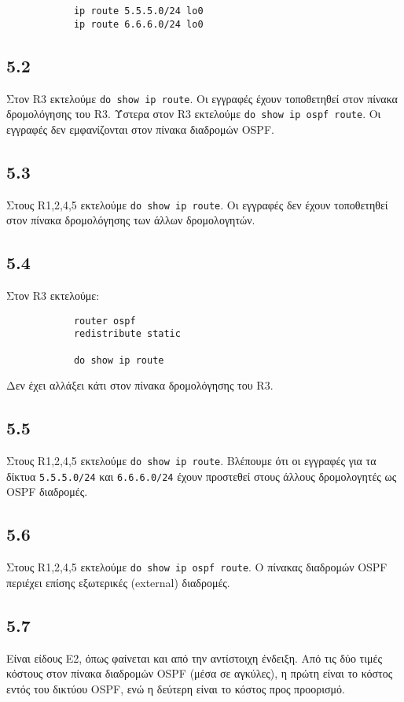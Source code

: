 \documentclass[a4paper, 12pt]{article}
\begin{document}
		\begin{verbatim}
			ip route 5.5.5.0/24 lo0
			ip route 6.6.6.0/24 lo0
		\end{verbatim}

	\subsection*{5.2}
		Στον R3 εκτελούμε \verb|do show ip route|. Οι εγγραφές έχουν τοποθετηθεί στον πίνακα δρομολόγησης του R3. Ύστερα στον R3 εκτελούμε \verb|do show ip ospf route|. Οι εγγραφές δεν εμφανίζονται στον πίνακα διαδρομών OSPF.

	\subsection*{5.3}
		Στους R1,2,4,5 εκτελούμε \verb|do show ip route|. Οι εγγραφές δεν έχουν τοποθετηθεί στον πίνακα δρομολόγησης των άλλων δρομολογητών.

	\subsection*{5.4}
		Στον R3 εκτελούμε:
		
		\begin{verbatim}
			router ospf
			redistribute static
		
			do show ip route
		\end{verbatim}
		
		Δεν έχει αλλάξει κάτι στον πίνακα δρομολόγησης του R3.

	\subsection*{5.5}
		Στους R1,2,4,5 εκτελούμε \verb|do show ip route|. Βλέπουμε ότι οι εγγραφές για τα δίκτυα \verb|5.5.5.0/24| και \verb|6.6.6.0/24| έχουν προστεθεί στους άλλους δρομολογητές ως OSPF διαδρομές.

	\subsection*{5.6}
		Στους R1,2,4,5 εκτελούμε \verb|do show ip ospf route|. Ο πίνακας διαδρομών OSPF περιέχει επίσης εξωτερικές (external) διαδρομές.

	\subsection*{5.7} 
		Είναι είδους E2, όπως φαίνεται και από την αντίστοιχη ένδειξη. Από τις δύο τιμές κόστους στον πίνακα διαδρομών OSPF (μέσα σε αγκύλες), η πρώτη είναι το κόστος εντός του δικτύου OSPF, ενώ η δεύτερη είναι το κόστος προς προορισμό.
\end{document}
